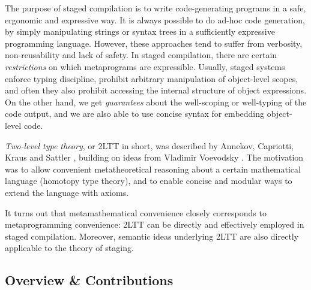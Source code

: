 \documentclass[acmsmall,review]{acmart}
\theoremstyle{remark}
\begin{document}
The purpose of staged compilation is to write code-generating programs in a
safe, ergonomic and expressive way. It is always possible to do ad-hoc code
generation, by simply manipulating strings or syntax trees in a sufficiently
expressive programming language. However, these approaches tend to suffer from
verbosity, non-reusability and lack of safety. In staged compilation, there are
certain \emph{restrictions} on which metaprograms are expressible. Usually,
staged systems enforce typing discipline, prohibit arbitrary manipulation of
object-level scopes, and often they also prohibit accessing the internal
structure of object expressions. On the other hand, we get \emph{guarantees}
about the well-scoping or well-typing of the code output, and we are also able
to use concise syntax for embedding object-level code.

\emph{Two-level type theory}, or 2LTT in short, was described by Annekov,
Capriotti, Kraus and Sattler \cite{twolevel}, building on ideas from Vladimir
Voevodsky \cite{hts}. The motivation was to allow convenient metatheoretical
reasoning about a certain mathematical language (homotopy type theory), and to
enable concise and modular ways to extend the language with axioms.

It turns out that metamathematical convenience closely corresponds to
metaprogramming convenience: 2LTT can be directly and effectively employed in
staged compilation. Moreover, semantic ideas underlying 2LTT are also directly
applicable to the theory of staging.

\subsection{Overview \& Contributions}\label{sec:overview}
\end{document}
